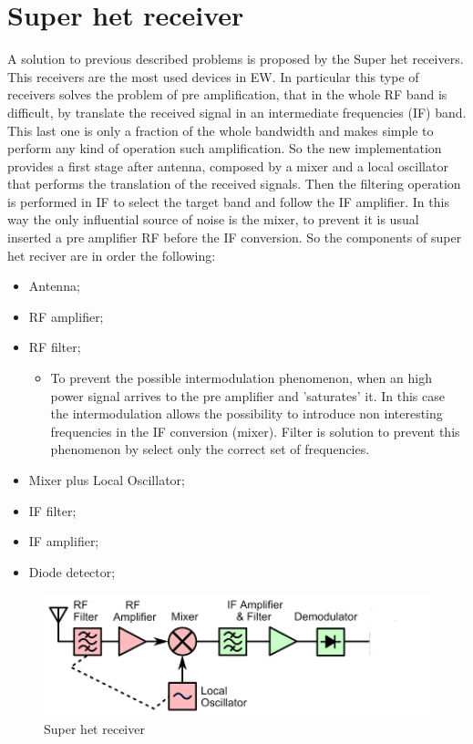 \documentclass[12pt]{report}
\begin{document}
\section{Super het receiver}  
A solution to previous described problems is proposed by the Super het receivers. This receivers are the most used devices in EW. In particular this type of receivers solves the problem of pre amplification, that in the whole RF band is difficult, by translate the received signal in an intermediate frequencies (IF) band. This last one is only a fraction of the whole bandwidth and makes simple to perform any kind of operation such amplification. So the new implementation provides a first stage after antenna, composed by a mixer and a local oscillator that performs the translation of the received signals. Then the filtering operation is performed in IF to select the target band and follow the IF amplifier. In this way the only influential source of noise is the mixer, to prevent it is usual inserted a pre amplifier RF before the IF conversion. So the components of super het reciver are in order the following:
\begin{itemize}
         \item Antenna;
         \item RF amplifier;
         \item RF filter;
         \begin{itemize}
            \item To prevent the possible intermodulation phenomenon, when an high power signal arrives to the pre amplifier and 'saturates' it.  In this case the intermodulation allows the possibility to introduce non interesting frequencies in the IF conversion (mixer). Filter is solution to prevent this phenomenon by select only the correct set of frequencies.
         \end{itemize}
         \item Mixer plus Local Oscillator;
         \item IF filter;
         \item IF amplifier;
         \item Diode detector;
\end{itemize}
\begin{figure}[h!]
    \centering
    \includegraphics[width=12cm]{Pictures/super het receiver.png}
    \caption{Super het receiver}
\end{figure}
\end{document}
